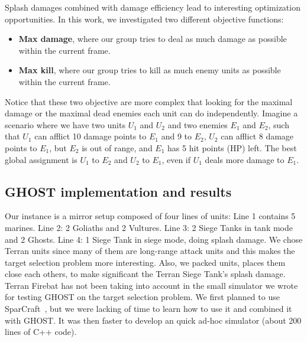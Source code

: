 \documentclass[journal]{IEEEtran}
\newcommand{\ghost}{\textsc{GHOST}\xspace}
\begin{document}
Splash  damages combined  with damage  efficiency lead  to interesting
optimization  opportunities.   In  this   work,  we  investigated  two
different objective functions:
\begin{itemize}
\item {\bf Max  damage}, where our group tries to  deal as much damage
  as possible within the current frame.
\item {\bf  Max kill},  where our  group tries to  kill as  much enemy
  units as possible within the current frame.
\end{itemize}
Notice that these two objective are  more complex that looking for the
maximal  damage  or  the  maximal   dead  enemies  each  unit  can  do
independently. Imagine  a scenario where we  have two units $U_1$  and $U_2$
and two enemies $E_1$  and $E_2$, such that $U_1$ can  afflict 10 damage points
to $E_1$ and 9 to $E_2$, $U_2$ can afflict 8 damage points to $E_1$, but $E_2$ is out
of  range,  and $E_1$  has  5  hit points  (HP)  left.   The best  global
assignment is $U_1$ to  $E_2$ and $U_2$ to $E_1$, even if $U_1$  deals more damage to
$E_1$.

\subsection{\ghost implementation and results}

Our instance is a mirror setup composed of four lines of units: Line 1
contains 5 marines. Line 2: 2 Goliaths and 2 Vultures. Line 3: 2 Siege
Tanks in tank mode  and 2 Ghosts. Line 4: 1 Siege  Tank in siege mode,
doing splash  damage.  We chose  Terran units  since many of  them are
long-range attack  units and this  makes the target  selection problem
more  interesting.  Also,  we  packed units,  places  them close  each
others, to make significant the Terran Siege Tank's splash damage.
Terran Firebat has not been taking into account in the small simulator
we wrote for testing \ghost on the target selection problem.  We first
planned    to    use   SparCraft~\cite{ChurchillB11,    ChurchillSB12,
  ChurchillB12}, but  we were lacking of  time to learn how  to use it
and combined  it with \ghost. It  was then faster to  develop an quick
ad-hoc simulator (about 200 lines of C++ code).
\end{document}
